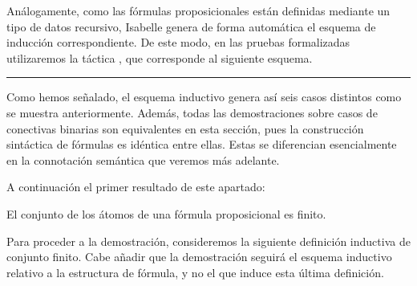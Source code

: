 \begin{isabellebody}
\begin{isamarkuptext}
  Análogamente, como las fórmulas proposicionales están definidas 
  mediante un tipo de datos recursivo, Isabelle genera de forma 
  automática el esquema de inducción correspondiente. De este modo, en 
  las pruebas formalizadas utilizaremos la táctica , 
  que corresponde al siguiente esquema.







  \rule{70mm}{0.1mm}


  Como hemos señalado, el esquema inductivo genera así seis casos 
  distintos como se muestra anteriormente. Además, todas las 
  demostraciones sobre casos de conectivas binarias son equivalentes en 
  esta sección, pues la construcción sintáctica de fórmulas es idéntica 
  entre ellas. Estas se diferencian esencialmente en la connotación 
  semántica que veremos más adelante.

  A continuación el primer resultado de este apartado:

  \begin{lema}
    El conjunto de los átomos de una fórmula proposicional es finito.
  \end{lema}

  Para proceder a la demostración, consideremos la siguiente
  definición inductiva de conjunto finito. Cabe añadir que la 
  demostración seguirá el esquema inductivo relativo a la estructura de 
  fórmula, y no el que induce esta última definición.


\end{isamarkuptext}
\end{isabellebody}
